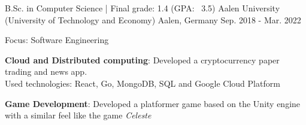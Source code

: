

\begin{cventries}

  \cventry
    {B.Sc. in Computer Science | Final grade: 1.4 (GPA: ~3.5)} %
    {Aalen University (University of Technology and Economy)} %
    {Aalen, Germany} %
    {Sep. 2018 - Mar. 2022} %
    {
      \begin{cvitems} %
        \item {Focus: Software Engineering}
        \item {\textbf{Cloud and Distributed computing}: Developed a cryptocurrency paper trading and news app. \\ Used technologies: React, Go, MongoDB, SQL and Google Cloud Platform}
        \item {\textbf{Game Development}: Developed a platformer game based on the Unity engine with a similar feel like the game \textit{Celeste}}
      \end{cvitems}
    }

\end{cventries}
